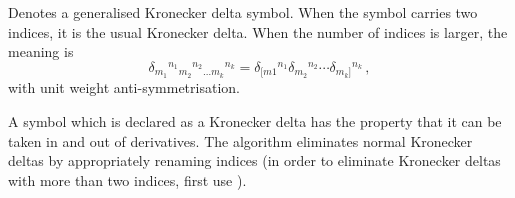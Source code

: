 
Denotes a generalised Kronecker
  delta symbol. When the symbol carries two indices, it is the usual
  Kronecker delta. When the number of indices is larger, the meaning
  is
\begin{equation}
\delta_{m_1}{}^{n_1}{}_{m_2}{}^{n_2}{}_{\ldots m_k}{}^{n_k} =
\delta_{[m 1}{}^{n_1} \delta_{m_2}{}^{n_2} \cdots \delta_{m_k]}{}^{n_k} \,,
\end{equation}
with unit weight anti-symmetrisation.  

A symbol which is declared as a
Kronecker delta has the property that it can be taken in and out of
derivatives. The algorithm  eliminates
normal Kronecker deltas by appropriately renaming indices (in order to
eliminate Kronecker deltas with more than two indices, first
use ).

